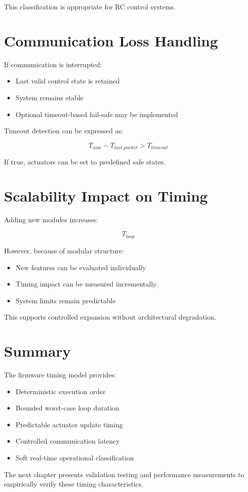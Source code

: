 This classification is appropriate for RC control systems.


\section{Communication Loss Handling}

If communication is interrupted:

\begin{itemize}
	\item Last valid control state is retained
	\item System remains stable
	\item Optional timeout-based fail-safe may be implemented
\end{itemize}

Timeout detection can be expressed as:

\[
T_{now} - T_{last\_packet} > T_{timeout}
\]

If true, actuators can be set to predefined safe states.


\section{Scalability Impact on Timing}

Adding new modules increases:

\[
T_{loop}
\]

However, because of modular structure:

\begin{itemize}
	\item New features can be evaluated individually
	\item Timing impact can be measured incrementally
	\item System limits remain predictable
\end{itemize}

This supports controlled expansion without architectural degradation.


\section{Summary}

The firmware timing model provides:

\begin{itemize}
	\item Deterministic execution order
	\item Bounded worst-case loop duration
	\item Predictable actuator update timing
	\item Controlled communication latency
	\item Soft real-time operational classification
\end{itemize}

The next chapter presents validation testing and performance measurements to empirically verify these timing characteristics.